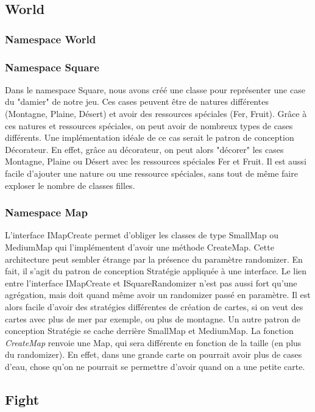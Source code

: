 		
	\subsection{World}
		\subsubsection{Namespace World}
			\subsubsection{Namespace Square}
				Dans le namespace Square, nous avons créé une classe pour représenter une case du "damier" de notre jeu.
			Ces cases peuvent être de natures différentes (Montagne, Plaine, Désert) et avoir des ressources spéciales (Fer, Fruit).
			Grâce à ces natures et ressources spéciales, on peut avoir de nombreux types de cases différents.
			Une implémentation idéale de ce cas serait le patron de conception Décorateur.
			En effet, grâce au décorateur, on peut alors "décorer" les cases Montagne, Plaine ou Désert avec les ressources spéciales Fer et Fruit.
			Il est aussi facile d'ajouter une nature ou une ressource spéciales, sans tout de même faire exploser le nombre de classes filles.
			
			\subsubsection{Namespace Map}
				L'interface IMapCreate permet d'obliger les classes de type SmallMap ou MediumMap qui l'implémentent d'avoir une méthode CreateMap. Cette architecture peut sembler étrange par la présence du paramètre randomizer.
			En fait, il s'agit du patron de conception Stratégie appliquée à une interface.
			Le lien entre l'interface IMapCreate et ISquareRandomizer n'est pas aussi fort qu'une agrégation, mais doit quand même avoir un randomizer passé en paramètre.
			Il est alors facile d'avoir des stratégies différentes de création de cartes, si on veut des cartes avec plus de mer par exemple, ou plus de montagne.
				Un autre patron de conception Stratégie se cache derrière SmallMap et MediumMap. La fonction \textit{CreateMap} renvoie une Map, qui sera différente en fonction de la taille (en plus du randomizer).
			En effet, dans une grande carte on pourrait avoir plus de cases d'eau, chose qu'on ne pourrait se permettre d'avoir quand on a une petite carte.
	
	\subsection{Fight}
